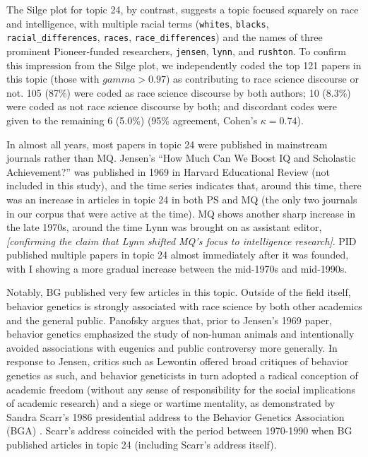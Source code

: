 \documentclass[12pt]{article}
\begin{document}
The Silge plot for topic 24, by contrast, suggests a topic focused squarely on race and intelligence, with multiple racial terms (\texttt{whites}, \texttt{blacks}, \texttt{racial\_differences}, \texttt{races}, \texttt{race\_differences}) and the names of three prominent Pioneer-funded researchers, \texttt{jensen}, \texttt{lynn}, and \texttt{rushton}. To confirm this impression from the Silge plot, we independently coded the top 121 papers in this topic (those with \(gamma > 0.97\)) as contributing to race science discourse or not. 105 (87\%) were coded as race science discourse by both authors; 10 (8.3\%) were coded as not race science discourse by both; and discordant codes were given to the remaining 6 (5.0\%) (95\% agreement, Cohen's \(\kappa = 0.74\)).

In almost all years, most papers in topic 24 were published in mainstream journals rather than MQ. Jensen's ``How Much Can We Boost IQ and Scholastic Achievement?'' \cite{JensenHowMuchCan1969} was published in 1969 in Harvard Educational Review (not included in this study), and the time series indicates that, around this time, there was an increase in articles in topic 24 in both PS and MQ (the only two journals in our corpus that were active at the time). MQ shows another sharp increase in the late 1970s, around the time Lynn was brought on as assistant editor, \emph{{[}confirming the claim that Lynn shifted MQ's focus to intelligence research{]}}. PID published multiple papers in topic 24 almost immediately after it was founded, with I showing a more gradual increase between the mid-1970s and mid-1990s.

Notably, BG published very few articles in this topic. Outside of the field itself, behavior genetics is strongly associated with race science by both other academics and the general public. Panofsky \cite{PanofskyMisbehavingScienceControversy2014} argues that, prior to Jensen's 1969 paper, behavior genetics emphasized the study of non-human animals and intentionally avoided associations with eugenics and public controversy more generally. In response to Jensen, critics such as Lewontin offered broad critiques of behavior genetics as such, and behavior geneticists in turn adopted a radical conception of academic freedom (without any sense of responsibility for the social implications of academic research) and a siege or wartime mentality, as demonstrated by Sandra Scarr's 1986 presidential address to the Behavior Genetics Association (BGA) \cite{ScarrThreeCheersBehavior1987}. Scarr's address coincided with the period between 1970-1990 when BG published articles in topic 24 (including Scarr's address itself).
\end{document}

